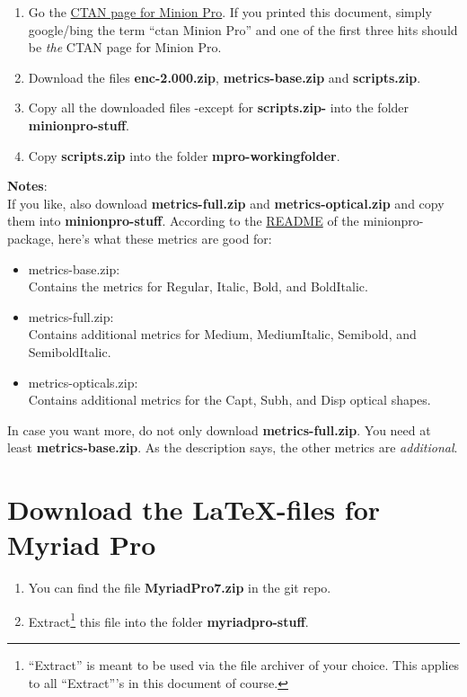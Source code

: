 \begin{enumerate}
	\item Go the \href{http://ctan.org/tex-archive/fonts/minionpro/}{CTAN page for Minion Pro}. If you printed this document, simply google/bing the term ``ctan Minion Pro'' and one of the first three hits should be \emph{the} CTAN page for Minion Pro.
	\item Download the files \textbf{enc-2.000.zip}, \textbf{metrics-base.zip} and \textbf{scripts.zip}.
	\item Copy all the downloaded files -except for \textbf{scripts.zip-} into the folder \textbf{minionpro-stuff}.
	\item Copy \textbf{scripts.zip} into the folder \textbf{mpro-workingfolder}.
\end{enumerate}
\textbf{Notes}:\\
If you like, also download \textbf{metrics-full.zip} and \textbf{metrics-optical.zip} and copy them into \textbf{minionpro-stuff}. According to the \href{http://www.ctan.org/tex-archive/fonts/Minion Pro/}{README} of the minionpro-package, here's what these metrics are good for:
\begin{itemize}
	\item metrics-base.zip: \\
	Contains the metrics for Regular, Italic, Bold, and BoldItalic.
	\item metrics-full.zip: \\
	Contains additional metrics for Medium, MediumItalic, Semibold, and SemiboldItalic.
	\item metrics-opticals.zip: \\
	Contains additional metrics for the Capt, Subh, and Disp optical shapes.
\end{itemize}
In case you want more, do not only download \textbf{metrics-full.zip}. You need at least \textbf{metrics-base.zip}. As the description says, the other metrics are \textit{additional}.

\section{Download the LaTeX-files for Myriad Pro}\label{sec:download-myriad}

\begin{enumerate}
	\item You can find the file \textbf{MyriadPro7.zip} in the git repo.
	\item Extract\footnote{``Extract'' is meant to be used via the file archiver of your choice. This applies to all ``Extract'''s in this document of course.} this file into the folder \textbf{myriadpro-stuff}.
\end{enumerate}

